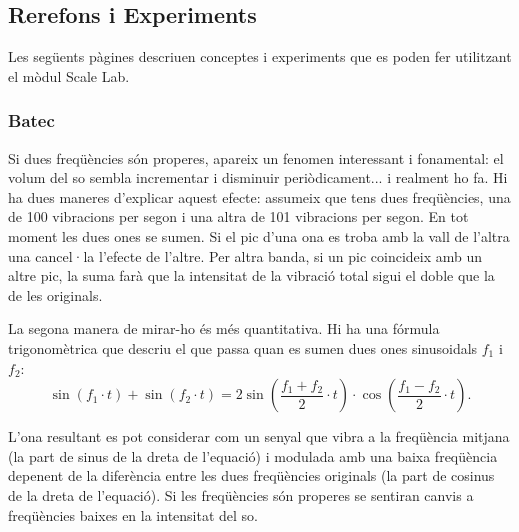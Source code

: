 \subsection{Rerefons i Experiments}
Les següents pàgines descriuen conceptes i experiments que es poden fer utilitzant el mòdul Scale Lab.

\subsubsection{Batec}
Si dues freqüències són properes, apareix un fenomen interessant i fonamental: el volum del so sembla incrementar i disminuir periòdicament... i realment ho fa. Hi ha dues maneres d'explicar aquest efecte: assumeix que tens dues freqüències, una de 100 vibracions per segon i una altra de 101 vibracions per segon. En tot moment les dues ones se sumen. Si el pic d'una ona es troba amb la vall de l'altra una cancel·la l'efecte de l'altre. Per altra banda, si un pic coincideix amb un altre pic, la suma farà que la intensitat de la vibració total sigui el doble que la de les originals.

\begin{figure}[h]
\centering
{}
\end{figure}

La segona manera de mirar-ho és més quantitativa. Hi ha una fórmula trigonomètrica que descriu el que passa quan es sumen dues ones sinusoidals $f_1$ i $f_2$:
$$\sin(f_1 \cdot t) + \sin(f_2\cdot t) = 2 \sin\left( \frac{f_1+f_2}{2}\cdot t\right) \cdot \cos\left( \frac{f_1-f_2}{2}\cdot t\right) .$$

L'ona resultant es pot considerar com un senyal que vibra a la freqüència mitjana (la part de sinus de la dreta de l'equació) i modulada amb una baixa freqüència depenent de la diferència entre les dues freqüències originals (la part de cosinus de la dreta de l'equació). Si les freqüències són properes se sentiran canvis a freqüències baixes en la intensitat del so.

